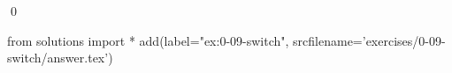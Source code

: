 
\begin{ex}
  \label{ex:0-09-switch}
  
  \qed
\end{ex}
\begin{python0}
from solutions import *
add(label="ex:0-09-switch",
    srcfilename='exercises/0-09-switch/answer.tex')
\end{python0}

